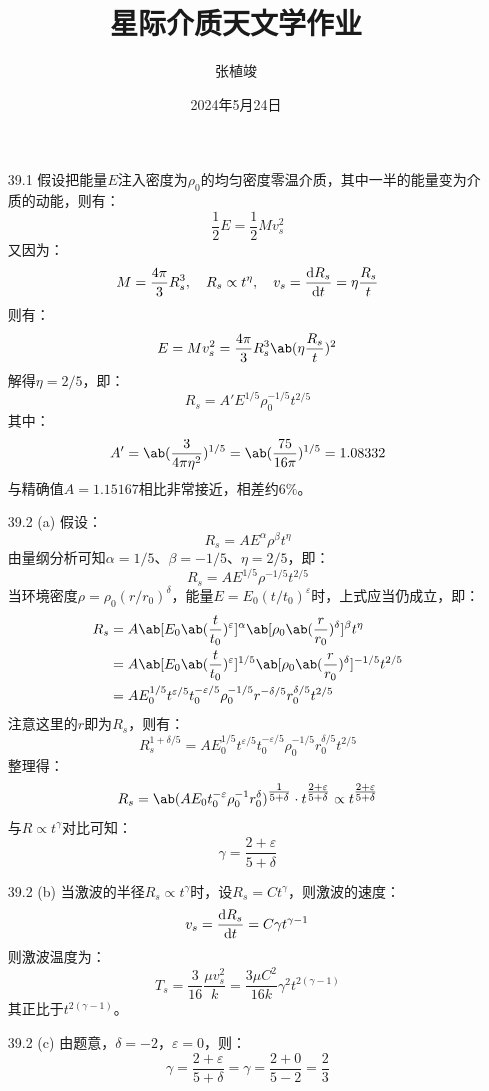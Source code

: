 \documentclass[a4paper,fontset=none]{ctexart}
\title{\textbf{星际介质天文学作业}}
\author{张植竣}
\date{2024年5月24日}
\renewcommand\epsilon{\varepsilon}
\begin{document}
\maketitle

\begin{enumerate}
    \item[39.1]
    假设把能量$E$注入密度为$\rho_0$的均匀密度零温介质，其中一半的能量变为介质的动能，则有：
    \[
        \frac{1}{2}E = \frac{1}{2}Mv_s^2
    \]
    又因为：
    \[
        M = \frac{4\pi}{3}R_s^3,\quad R_s \propto t^\eta,\quad v_s = \odv{R_s}{t} = \eta\frac{R_s}{t}
    \]
    则有：
    \[
        E = Mv_s^2 = \frac{4\pi}{3}R_s^3 \ab(\eta\frac{R_s}{t})^2
    \]
    解得$\eta = 2/5$，即：
    \[
        R_s = A'E^{1/5}\rho_0^{-1/5}t^{2/5}
    \]
    其中：
    \[
        A' = \ab(\frac{3}{4\pi\eta^2})^{1/5} = \ab(\frac{75}{16\pi})^{1/5} = 1.08332
    \]
    与精确值$A = 1.15167$相比非常接近，相差约$6\%$。

    \bigskip
    \item[39.2 (a)]
    假设：
    \[
        R_s = A E^\alpha \rho^\beta t^\eta
    \]
    由量纲分析可知$\alpha = 1/5$、$\beta = -1/5$、$\eta = 2/5$，即：
    \[
        R_s = A E^{1/5} \rho^{-1/5} t^{2/5}
    \]
    当环境密度$\rho = \rho_0(r/r_0)^\delta$，能量$E = E_0(t/t_0)^\epsilon$时，上式应当仍成立，即：
    \begin{align*}
        R_s
        &= A \ab[E_0 \ab(\frac{t}{t_0})^\epsilon]^\alpha \ab[\rho_0 \ab(\frac{r}{r_0})^\delta]^\beta t^\eta \\
        &= A \ab[E_0 \ab(\frac{t}{t_0})^\epsilon]^{1/5} \ab[\rho_0 \ab(\frac{r}{r_0})^\delta]^{-1/5} t^{2/5} \\
        &= A E_0^{1/5} t^{\epsilon/5} t_0^{-\epsilon/5} \rho_0^{-1/5} r^{-\delta/5} r_0^{\delta/5} t^{2/5}
    \end{align*}
    注意这里的$r$即为$R_s$，则有：
    \[
        R_s^{1+\delta/5} = A E_0^{1/5} t^{\epsilon/5} t_0^{-\epsilon/5} \rho_0^{-1/5} r_0^{\delta/5} t^{2/5}
    \]
    整理得：
    \[
        R_s = \ab(A E_0 t_0^{-\epsilon} \rho_0^{-1} r_0^\delta)^{\tfrac{1}{5+\delta}} \cdot t^{\tfrac{2+\epsilon}{5+\delta}} \propto t^{\tfrac{2+\epsilon}{5+\delta}}
    \]
    与$R \propto t^\gamma$对比可知：
    \[
        \gamma = \frac{2+\epsilon}{5+\delta}
    \]

    \medskip
    \item[39.2 (b)]
    当激波的半径$R_s \propto t^\gamma$时，设$R_s = Ct^\gamma$，则激波的速度：
    \[
        v_s = \odv{R_s}{t} = C\gamma t^{\gamma - 1}
    \]
    则激波温度为：
    \[
        T_s = \frac{3}{16} \frac{\mu v_s^2}{k} = \frac{3\mu C^2}{16k} \gamma^2 t^{2(\gamma - 1)}
    \]
    其正比于$t^{2(\gamma - 1)}$。

    \medskip
    \item[39.2 (c)]
    由题意，$\delta = -2$，$\epsilon = 0$，则：
    \[
        \gamma = \frac{2+\epsilon}{5+\delta} = \gamma = \frac{2+0}{5-2} = \frac{2}{3}
    \]
\end{enumerate}
\end{document}
